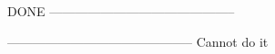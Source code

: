
DONE
--------------------------------------------



--------------------------------------------
Cannot do it